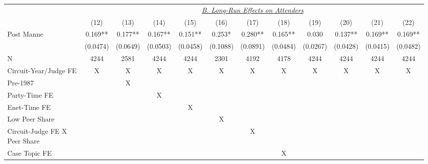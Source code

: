 \begin{center}
{\begin{tabular}{l*{11}{c}}
                    &\multicolumn{11}{c}{\uline{\textit{B. Long-Run Effects on Attenders}}}                                                                                              \\
                    &        (12)  &        (13)  &        (14)  &        (15)  &        (16)  &        (17)  &        (18)  &        (19)  &        (20)  &        (21)  &        (22)  \\
\cmidrule(lr){2-12}
Post Manne          &       0.169**&       0.177**&       0.167**&       0.151**&       0.253* &       0.280**&       0.165**&       0.030  &       0.137**&       0.169**&       0.169**\\
                    &    (0.0474)  &    (0.0649)  &    (0.0503)  &    (0.0458)  &    (0.1088)  &    (0.0891)  &    (0.0484)  &    (0.0267)  &    (0.0428)  &    (0.0415)  &    (0.0482)  \\
\cmidrule(lr){1-12}
N                   &        4244  &        2581  &        4244  &        4244  &        2301  &        4192  &        4178  &        4244  &        4244  &        4244  &        4244  \\
Circuit-Year/Judge FE&           X  &           X  &           X  &           X  &           X  &           X  &           X  &           X  &           X  &           X  &           X  \\
Pre-1987            &              &           X  &              &              &              &              &              &              &              &              &              \\
Party-Time FE       &              &              &           X  &              &              &              &              &              &              &              &              \\
Enet-Time FE        &              &              &              &           X  &              &              &              &              &              &              &              \\
Low Peer Share      &              &              &              &              &           X  &              &              &              &              &              &              \\
Circuit-Judge FE X Peer Share&              &              &              &              &              &           X  &              &              &              &              &              \\
Case Topic FE       &              &              &              &              &              &              &           X  &              &              &              &              \\

\end{tabular}}
\end{center}

